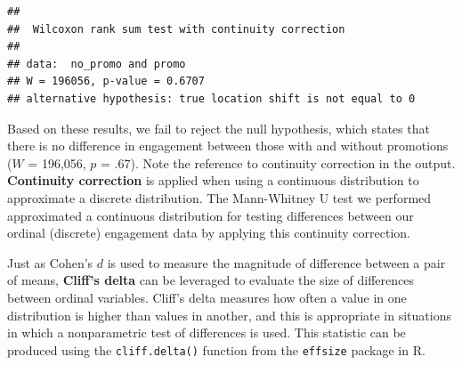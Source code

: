 \documentclass[]{book}
\newenvironment{Shaded}{\begin{snugshade}}{\end{snugshade}}
\newcommand{\CommentTok}[1]{\textcolor[rgb]{0.56,0.35,0.01}{\textit{#1}}}
\newcommand{\DataTypeTok}[1]{\textcolor[rgb]{0.13,0.29,0.53}{#1}}
\newcommand{\DecValTok}[1]{\textcolor[rgb]{0.00,0.00,0.81}{#1}}
\newcommand{\KeywordTok}[1]{\textcolor[rgb]{0.13,0.29,0.53}{\textbf{#1}}}
\newcommand{\NormalTok}[1]{#1}
\newcommand{\OperatorTok}[1]{\textcolor[rgb]{0.81,0.36,0.00}{\textbf{#1}}}
\newcommand{\StringTok}[1]{\textcolor[rgb]{0.31,0.60,0.02}{#1}}
\begin{document}
\begin{Shaded}
\end{Shaded}

\begin{verbatim}
## 
##  Wilcoxon rank sum test with continuity correction
## 
## data:  no_promo and promo
## W = 196056, p-value = 0.6707
## alternative hypothesis: true location shift is not equal to 0
\end{verbatim}

Based on these results, we fail to reject the null hypothesis, which states that there is no difference in engagement between those with and without promotions (\(W\) = 196,056, \(p\) = .67). Note the reference to continuity correction in the output. \textbf{Continuity correction} is applied when using a continuous distribution to approximate a discrete distribution. The Mann-Whitney U test we performed approximated a continuous distribution for testing differences between our ordinal (discrete) engagement data by applying this continuity correction.

Just as Cohen's \(d\) is used to measure the magnitude of difference between a pair of means, \textbf{Cliff's delta} can be leveraged to evaluate the size of differences between ordinal variables. Cliff's delta measures how often a value in one distribution is higher than values in another, and this is appropriate in situations in which a nonparametric test of differences is used. This statistic can be produced using the \texttt{cliff.delta()} function from the \texttt{effsize} package in R.
\end{document}
